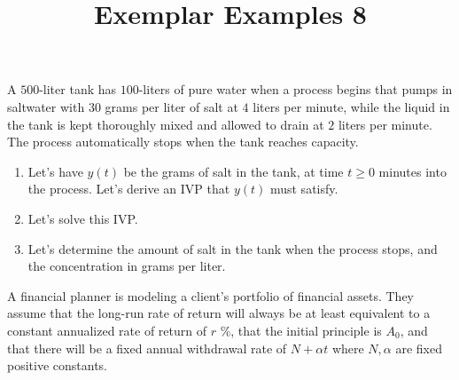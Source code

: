 \documentclass{ximera}
\begin{document}
\begin{abstract}
 \end{abstract}

    \title{Exemplar Examples 8}
    
    \maketitle

A $500$-liter tank has $100$-liters of pure water when a process begins that pumps in saltwater with $30$ grams per liter of salt at $4$ liters per minute, while the liquid in the tank is kept thoroughly mixed and allowed to drain at $2$ liters per minute.  The process automatically stops when the tank reaches capacity.


\begin{enumerate}

\item Let's have $y(t)$ be the grams of salt in the tank, at time $t\geq 0$ minutes into the process.   Let's derive an IVP that $y(t)$ must satisfy.    



\vfill

\item Let's solve this IVP.

\vfill
\vfill







\item Let's determine the amount of salt in the tank when the process stops, and the concentration in grams per liter.



\vfill

\end{enumerate}



\newpage


A financial planner is modeling a client's portfolio of financial assets.  They assume that the long-run rate of return will always be at least equivalent to a constant annualized rate of return of $r$ \%, that the initial principle is $A_0$, and that there will be a fixed annual withdrawal rate of $N+\alpha t$ where $N,\alpha$ are fixed positive constants.
\end{document}
